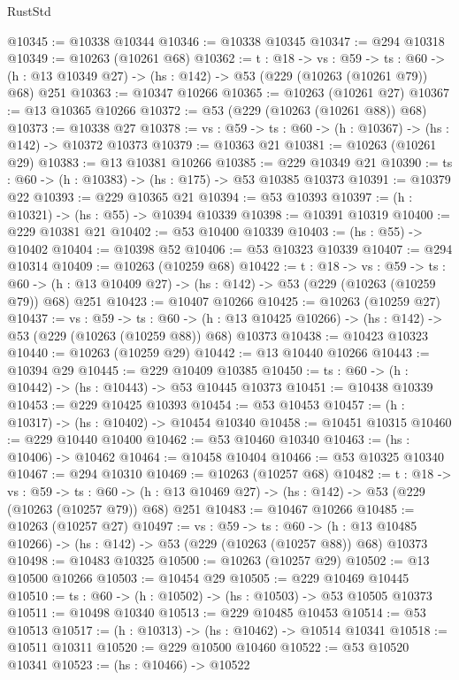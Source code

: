 \begin{lexlean}{RustStd}
\begin{coremodule}
@10345 := @10338 @10344
@10346 := @10338 @10345
@10347 := @294 @10318
@10349 := @10263 (@10261 @68)
@10362 := {t : @18} ->
  {vs : @59} ->
  {ts : @60} -> (h : @13 @10349 @27) -> (hs : @142) -> @53 (@229 (@10263 (@10261 @79)) @68) @251
@10363 := @10347 @10266
@10365 := @10263 (@10261 @27)
@10367 := @13 @10365 @10266
@10372 := @53 (@229 (@10263 (@10261 @88)) @68)
@10373 := @10338 @27
@10378 := {vs : @59} -> {ts : @60} -> (h : @10367) -> (hs : @142) -> @10372 @10373
@10379 := @10363 @21
@10381 := @10263 (@10261 @29)
@10383 := @13 @10381 @10266
@10385 := @229 @10349 @21
@10390 := {ts : @60} -> (h : @10383) -> (hs : @175) -> @53 @10385 @10373
@10391 := @10379 @22
@10393 := @229 @10365 @21
@10394 := @53 @10393
@10397 := (h : @10321) -> (hs : @55) -> @10394 @10339
@10398 := @10391 @10319
@10400 := @229 @10381 @21
@10402 := @53 @10400 @10339
@10403 := (hs : @55) -> @10402
@10404 := @10398 @52
@10406 := @53 @10323 @10339
@10407 := @294 @10314
@10409 := @10263 (@10259 @68)
@10422 := {t : @18} ->
  {vs : @59} ->
  {ts : @60} -> (h : @13 @10409 @27) -> (hs : @142) -> @53 (@229 (@10263 (@10259 @79)) @68) @251
@10423 := @10407 @10266
@10425 := @10263 (@10259 @27)
@10437 := {vs : @59} ->
  {ts : @60} ->
  (h : @13 @10425 @10266) -> (hs : @142) -> @53 (@229 (@10263 (@10259 @88)) @68) @10373
@10438 := @10423 @10323
@10440 := @10263 (@10259 @29)
@10442 := @13 @10440 @10266
@10443 := @10394 @29
@10445 := @229 @10409 @10385
@10450 := {ts : @60} -> (h : @10442) -> (hs : @10443) -> @53 @10445 @10373
@10451 := @10438 @10339
@10453 := @229 @10425 @10393
@10454 := @53 @10453
@10457 := (h : @10317) -> (hs : @10402) -> @10454 @10340
@10458 := @10451 @10315
@10460 := @229 @10440 @10400
@10462 := @53 @10460 @10340
@10463 := (hs : @10406) -> @10462
@10464 := @10458 @10404
@10466 := @53 @10325 @10340
@10467 := @294 @10310
@10469 := @10263 (@10257 @68)
@10482 := {t : @18} ->
  {vs : @59} ->
  {ts : @60} -> (h : @13 @10469 @27) -> (hs : @142) -> @53 (@229 (@10263 (@10257 @79)) @68) @251
@10483 := @10467 @10266
@10485 := @10263 (@10257 @27)
@10497 := {vs : @59} ->
  {ts : @60} ->
  (h : @13 @10485 @10266) -> (hs : @142) -> @53 (@229 (@10263 (@10257 @88)) @68) @10373
@10498 := @10483 @10325
@10500 := @10263 (@10257 @29)
@10502 := @13 @10500 @10266
@10503 := @10454 @29
@10505 := @229 @10469 @10445
@10510 := {ts : @60} -> (h : @10502) -> (hs : @10503) -> @53 @10505 @10373
@10511 := @10498 @10340
@10513 := @229 @10485 @10453
@10514 := @53 @10513
@10517 := (h : @10313) -> (hs : @10462) -> @10514 @10341
@10518 := @10511 @10311
@10520 := @229 @10500 @10460
@10522 := @53 @10520 @10341
@10523 := (hs : @10466) -> @10522

\end{coremodule}
\end{lexlean}

